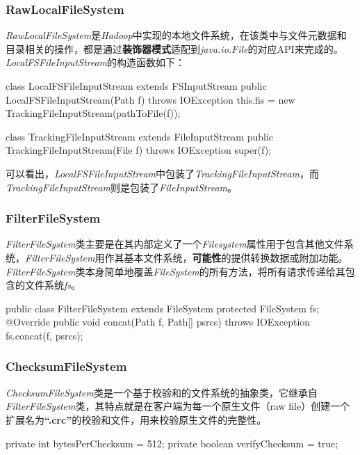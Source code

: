     \subsubsection{RawLocalFileSystem}
        \textit{RawLocalFileSystem}是\textit{Hadoop}中实现的本地文件系统，在该类中与文件元数据和目录相关的操作，都是通过\textbf{装饰器模式}适配到\textit{java.io.File}的对应API来完成的。\\
        \textit{LocalFSFileInputStream}的构造函数如下：
        \begin{java}[caption=LocalFSFileInputStream]
class LocalFSFileInputStream extends FSInputStream {
    public LocalFSFileInputStream(Path f) throws IOException {
        this.fis = new TrackingFileInputStream(pathToFile(f));
    }
}
        \end{java}
        \begin{java}[caption=TrackingFileInputStream]
class TrackingFileInputStream extends FileInputStream {
    public TrackingFileInputStream(File f) throws IOException {
        super(f);
    }
}
        \end{java}
    可以看出，\textit{LocalFSFileInputStream}中包装了\textit{TrackingFileInputStream}，而\textit{TrackingFileInputStream}则是包装了\textit{FileInputStream}。

    \subsubsection{FilterFileSystem}
        \textit{FilterFileSystem}类主要是在其内部定义了一个\textit{Filesystem}属性用于包含其他文件系统，\textit{FilterFileSystem}用作其基本文件系统，\textbf{可能性}的提供转换数据或附加功能。\\
        \textit{FilterFileSystem}类本身简单地覆盖\textit{FileSystem}的所有方法，将所有请求传递给其包含的文件系统\textit{fs}。
        \begin{java}[caption=FilterFileSystem]
public class FilterFileSystem extends FileSystem {
    protected FileSystem fs;
    @Override
    public void concat(Path f, Path[] psrcs) throws IOException {
        fs.concat(f, psrcs);
    }
}
        \end{java}

    \subsubsection{ChecksumFileSystem}
        \textit{ChecksumFileSystem}类是一个基于校验和的文件系统的抽象类，它继承自\textit{FilterFileSystem}类，其特点就是在客户端为每一个原生文件（raw file）创建一个扩展名为\textbf{“.crc”}的校验和文件，用来校验原生文件的完整性。
        \begin{java}[caption=ChecksumFileSystem]
private int bytesPerChecksum = 512; 
private boolean verifyChecksum = true; 
        \end{java}
        
